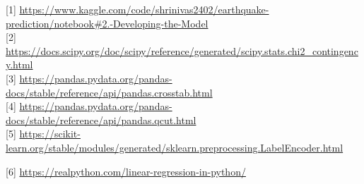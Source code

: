 \documentclass{article}
\begin{document}
{
\small


[1] \url{https://www.kaggle.com/code/shrinivas2402/earthquake-prediction/notebook#2.-Developing-the-Model}\\


[2] \url{https://docs.scipy.org/doc/scipy/reference/generated/scipy.stats.chi2_contingency.html}\\


[3] \url{https://pandas.pydata.org/pandas-docs/stable/reference/api/pandas.crosstab.html}\\

[4] \url{https://pandas.pydata.org/pandas-docs/stable/reference/api/pandas.qcut.html}\\

[5] \url{https://scikit-learn.org/stable/modules/generated/sklearn.preprocessing.LabelEncoder.html}

[6] \url{https://realpython.com/linear-regression-in-python/}
}

\end{document}
